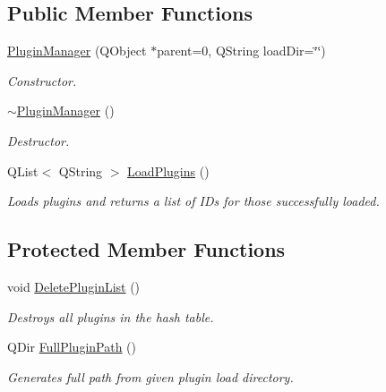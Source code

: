 \subsection*{Public Member Functions}
\begin{DoxyCompactItemize}
\item 
\hyperlink{class_plugin_manager_aac3752227a8bdae34eada08e6b80c3ce}{Plugin\-Manager} (Q\-Object $\ast$parent=0, Q\-String load\-Dir=\char`\"{}\char`\"{})
\begin{DoxyCompactList}\small\item\em Constructor. \end{DoxyCompactList}\item 
\hypertarget{class_plugin_manager_ab657302ef5af357907ae11ad817f5dfc}{\hyperlink{class_plugin_manager_ab657302ef5af357907ae11ad817f5dfc}{$\sim$\-Plugin\-Manager} ()}\label{class_plugin_manager_ab657302ef5af357907ae11ad817f5dfc}

\begin{DoxyCompactList}\small\item\em Destructor. \end{DoxyCompactList}\item 
Q\-List$<$ Q\-String $>$ \hyperlink{class_plugin_manager_a31f3817b1f01dac04059827dc0fe37f7}{Load\-Plugins} ()
\begin{DoxyCompactList}\small\item\em Loads plugins and returns a list of I\-Ds for those successfully loaded. \end{DoxyCompactList}\end{DoxyCompactItemize}
\subsection*{Protected Member Functions}
\begin{DoxyCompactItemize}
\item 
\hypertarget{class_plugin_manager_a7299c68a352c5fde51e803b32828b3da}{void \hyperlink{class_plugin_manager_a7299c68a352c5fde51e803b32828b3da}{Delete\-Plugin\-List} ()}\label{class_plugin_manager_a7299c68a352c5fde51e803b32828b3da}

\begin{DoxyCompactList}\small\item\em Destroys all plugins in the hash table. \end{DoxyCompactList}\item 
Q\-Dir \hyperlink{class_plugin_manager_a08a9b22dabdc191e7ce173c8fca93821}{Full\-Plugin\-Path} ()
\begin{DoxyCompactList}\small\item\em Generates full path from given plugin load directory. \end{DoxyCompactList}\end{DoxyCompactItemize}
